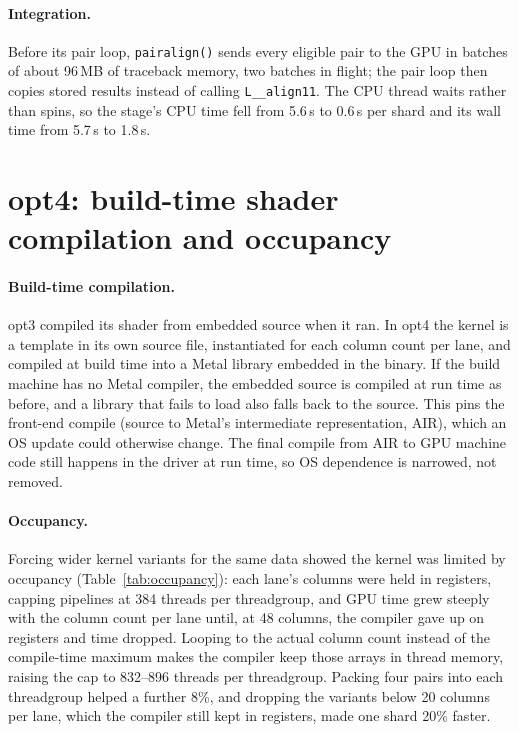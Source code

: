 \documentclass[11pt]{article}
\newcommand{\code}[1]{\texttt{#1}}
\begin{document}
\paragraph{Integration.} Before its pair loop, \code{pairalign()} sends every eligible pair to
the GPU in batches of about 96\,MB of traceback memory, two batches in flight; the pair loop
then copies stored results instead of calling \code{L\_\_align11}. The CPU thread waits
rather than spins, so the stage's CPU time fell from 5.6\,s to 0.6\,s per shard and its
wall time from 5.7\,s to 1.8\,s.

\section{opt4: build-time shader compilation and occupancy}
\label{sec:opt4}

\paragraph{Build-time compilation.} opt3 compiled its shader from embedded source when it ran.
In opt4 the kernel is a template in its own source file, instantiated for each column
count per lane, and compiled at build time into a Metal library embedded in the binary.
If the build machine has no Metal compiler, the embedded source is compiled at run time
as before, and a library that fails to load also falls back to the source. This pins the
front-end compile (source to Metal's intermediate representation, AIR), which an OS update
could otherwise change. The final compile from AIR to GPU machine code still happens in
the driver at run time, so OS dependence is narrowed, not removed.

\paragraph{Occupancy.} Forcing wider kernel variants for the same data showed the kernel was
limited by occupancy (Table~\ref{tab:occupancy}): each lane's columns were held in registers,
capping pipelines at 384 threads per threadgroup, and GPU time grew steeply with the column
count per lane until, at 48 columns, the compiler gave up on registers and time dropped.
Looping to the actual column count instead of the compile-time maximum makes the compiler
keep those arrays in thread memory, raising the cap to 832--896 threads per threadgroup.
Packing four pairs into each threadgroup helped a further 8\%, and dropping the variants below
20 columns per lane, which the compiler still kept in registers, made one shard 20\% faster.
\end{document}
